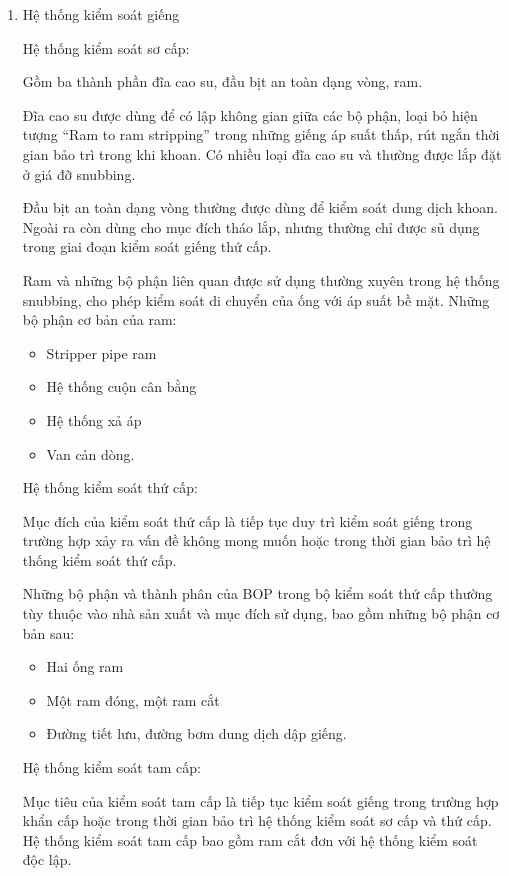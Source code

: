 \documentclass[13pt,a4paper]{article}
\begin{document}
\begin{enumerate}
		\item Hệ thống kiểm soát giếng \par
		Hệ thống kiểm soát sơ cấp:\par
		Gồm ba thành phần đĩa cao su, đầu bịt an toàn dạng vòng, ram.\par
		Đĩa cao su được dùng để có lập không gian giữa các bộ phận, loại bỏ hiện tượng ``Ram to ram stripping'' trong những giếng áp suất thấp, rút ngắn thời gian bảo trì trong khi khoan. Có nhiều loại đĩa cao su và thường được lắp đặt ở giá đỡ snubbing.\par
		Đầu bịt an toàn dạng vòng thường được dùng để kiểm soát dung dịch khoan. Ngoài ra còn dùng cho mục đích tháo lắp, nhưng thường chỉ được sủ dụng trong giai đoạn kiểm soát giếng thứ cấp.\par
		Ram và những bộ phận liên quan được sử dụng thường xuyên trong hệ thống snubbing, cho phép kiểm soát di chuyển của ống với áp suất bề mặt. Những bộ phận cơ bản của ram:
		\begin{itemize}
			\item Stripper pipe ram
			\item Hệ thống cuộn cân bằng
			\item Hệ thống xả áp
			\item Van cản dòng.
		\end{itemize}
		\par 
		Hệ thống kiểm soát thứ cấp: \par
		Mục đích của kiểm soát thứ cấp là tiếp tục duy trì kiểm soát giếng trong trường hợp xảy ra vấn đề không mong muốn hoặc trong thời gian bảo trì hệ thống kiểm soát thứ cấp.\par
		Những bộ phận và thành phân của BOP trong bộ kiểm soát thứ cấp thường tùy thuộc vào nhà sản xuất và mục đích sử dụng, bao gồm những bộ phận cơ bản sau:
			\begin{itemize}
				\item Hai ống ram
				\item Một ram đóng, một ram cắt
				\item Đường tiết lưu, đường bơm dung dịch dập giếng.
			\end{itemize}
		\par
		Hệ thống kiểm soát tam cấp:\par
		Mục tiêu của kiểm soát tam cấp là tiếp tục kiểm soát giếng trong trường hợp khẩn cấp hoặc trong thời gian bảo trì hệ thống kiểm soát sơ cấp và thứ cấp. Hệ thống kiểm soát tam cấp bao gồm ram cắt đơn với hệ thống kiểm soát độc lập.\par

\end{enumerate}
\end{document}
